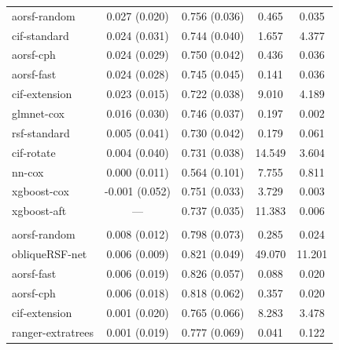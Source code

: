 \documentclass[12pt]{article}\usepackage[]{graphicx}\usepackage[]{xcolor}
\newenvironment{knitrout}{}{} %
\begin{document}
\begin{knitrout}
\begin{longtable}[t]{lcccc}
\hspace{1em}aorsf-random & 0.027 (0.020) & 0.756 (0.036) & 0.465 & 0.035\\
\hspace{1em}cif-standard & 0.024 (0.031) & 0.744 (0.040) & 1.657 & 4.377\\
\hspace{1em}aorsf-cph & 0.024 (0.029) & 0.750 (0.042) & 0.436 & 0.036\\
\hspace{1em}aorsf-fast & 0.024 (0.028) & 0.745 (0.045) & 0.141 & 0.036\\
\hspace{1em}cif-extension & 0.023 (0.015) & 0.722 (0.038) & 9.010 & 4.189\\
\hspace{1em}glmnet-cox & 0.016 (0.030) & 0.746 (0.037) & 0.197 & 0.002\\
\hspace{1em}rsf-standard & 0.005 (0.041) & 0.730 (0.042) & 0.179 & 0.061\\
\hspace{1em}cif-rotate & 0.004 (0.040) & 0.731 (0.038) & 14.549 & 3.604\\
\hspace{1em}nn-cox & 0.000 (0.011) & 0.564 (0.101) & 7.755 & 0.811\\
\hspace{1em}xgboost-cox & -0.001 (0.052) & 0.751 (0.033) & 3.729 & 0.003\\
\hspace{1em}xgboost-aft & --- & 0.737 (0.035) & 11.383 & 0.006\\
\addlinespace[0.3em]
\multicolumn{5}{l}{\textit{\textbf{ACTG 320; death, n = 1151, p = 12}}}\\
\hline
\hspace{1em}aorsf-random & 0.008 (0.012) & 0.798 (0.073) & 0.285 & 0.024\\
\hspace{1em}obliqueRSF-net & 0.006 (0.009) & 0.821 (0.049) & 49.070 & 11.201\\
\hspace{1em}aorsf-fast & 0.006 (0.019) & 0.826 (0.057) & 0.088 & 0.020\\
\hspace{1em}aorsf-cph & 0.006 (0.018) & 0.818 (0.062) & 0.357 & 0.020\\
\hspace{1em}cif-extension & 0.001 (0.020) & 0.765 (0.066) & 8.283 & 3.478\\
\hspace{1em}ranger-extratrees & 0.001 (0.019) & 0.777 (0.069) & 0.041 & 0.122\\

\end{longtable}
\end{knitrout}
\end{document}
